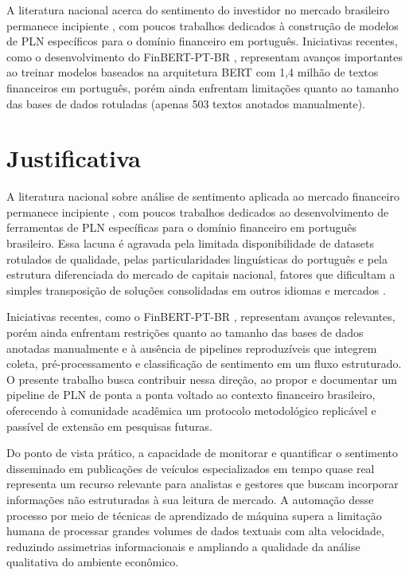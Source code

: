 A literatura nacional acerca do sentimento do investidor no mercado brasileiro permanece incipiente \cite{galdi2018}, com poucos trabalhos dedicados à construção de modelos de PLN específicos para o domínio financeiro em português. Iniciativas recentes, como o desenvolvimento do FinBERT-PT-BR \cite{santos2023finbert}, representam avanços importantes ao treinar modelos baseados na arquitetura BERT com 1,4 milhão de textos financeiros em português, porém ainda enfrentam limitações quanto ao tamanho das bases de dados rotuladas (apenas 503 textos anotados manualmente).


\section{Justificativa}

A literatura nacional sobre análise de sentimento aplicada ao mercado financeiro permanece incipiente \cite{galdi2018}, com poucos trabalhos dedicados ao desenvolvimento de ferramentas de PLN específicas para o domínio financeiro em português brasileiro. Essa lacuna é agravada pela limitada disponibilidade de datasets rotulados de qualidade, pelas particularidades linguísticas do português e pela estrutura diferenciada do mercado de capitais nacional, fatores que dificultam a simples transposição de soluções consolidadas em outros idiomas e mercados \cite{santos2023finbert}.

Iniciativas recentes, como o FinBERT-PT-BR \cite{santos2023finbert}, representam avanços relevantes, porém ainda enfrentam restrições quanto ao tamanho das bases de dados anotadas manualmente e à ausência de pipelines reproduzíveis que integrem coleta, pré-processamento e classificação de sentimento em um fluxo estruturado. O presente trabalho busca contribuir nessa direção, ao propor e documentar um pipeline de PLN de ponta a ponta voltado ao contexto financeiro brasileiro, oferecendo à comunidade acadêmica um protocolo metodológico replicável e passível de extensão em pesquisas futuras.

Do ponto de vista prático, a capacidade de monitorar e quantificar o sentimento disseminado em publicações de veículos especializados em tempo quase real representa um recurso relevante para analistas e gestores que buscam incorporar informações não estruturadas à sua leitura de mercado. A automação desse processo por meio de técnicas de aprendizado de máquina supera a limitação humana de processar grandes volumes de dados textuais com alta velocidade, reduzindo assimetrias informacionais e ampliando a qualidade da análise qualitativa do ambiente econômico.


